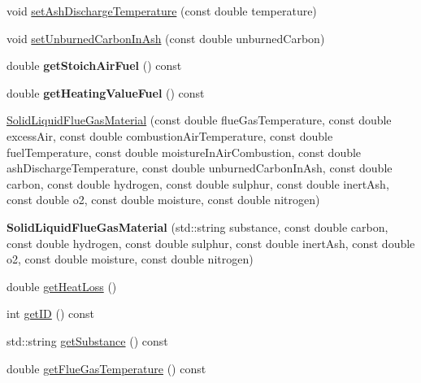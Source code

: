 \begin{DoxyCompactItemize}
\item 
void \hyperlink{class_solid_liquid_flue_gas_material_ad29543a88737c3d051c7d824287bc791}{set\+Ash\+Discharge\+Temperature} (const double temperature)
\item 
void \hyperlink{class_solid_liquid_flue_gas_material_adf052dd1bdceeab710a4986b1fd874b9}{set\+Unburned\+Carbon\+In\+Ash} (const double unburned\+Carbon)
\item 
\mbox{\label{class_solid_liquid_flue_gas_material_a0fc7264baa34c702ffbb79cfb0ec9f59}} 
double {\bfseries get\+Stoich\+Air\+Fuel} () const
\item 
\mbox{\label{class_solid_liquid_flue_gas_material_af9742946465fb1a27533ead1c0174193}} 
double {\bfseries get\+Heating\+Value\+Fuel} () const
\item 
\hyperlink{class_solid_liquid_flue_gas_material_a91e7c5e670b3db4fedcbc494448644d5}{Solid\+Liquid\+Flue\+Gas\+Material} (const double flue\+Gas\+Temperature, const double excess\+Air, const double combustion\+Air\+Temperature, const double fuel\+Temperature, const double moisture\+In\+Air\+Combustion, const double ash\+Discharge\+Temperature, const double unburned\+Carbon\+In\+Ash, const double carbon, const double hydrogen, const double sulphur, const double inert\+Ash, const double o2, const double moisture, const double nitrogen)
\item 
\mbox{\label{class_solid_liquid_flue_gas_material_a20ad2bd800e215fdaa1c534355cc803b}} 
{\bfseries Solid\+Liquid\+Flue\+Gas\+Material} (std\+::string substance, const double carbon, const double hydrogen, const double sulphur, const double inert\+Ash, const double o2, const double moisture, const double nitrogen)
\item 
double \hyperlink{class_solid_liquid_flue_gas_material_af7d36673e49f9b5eb631fc04227883d6}{get\+Heat\+Loss} ()
\item 
int \hyperlink{class_solid_liquid_flue_gas_material_afb124b546137da7ba99e31616198e0c8}{get\+ID} () const
\item 
std\+::string \hyperlink{class_solid_liquid_flue_gas_material_a6e07a23fb05c15c7e5dba39334988de8}{get\+Substance} () const
\item 
double \hyperlink{class_solid_liquid_flue_gas_material_aba4604158b3c624496d7de4b5fb511e2}{get\+Flue\+Gas\+Temperature} () const

\end{DoxyCompactItemize}
